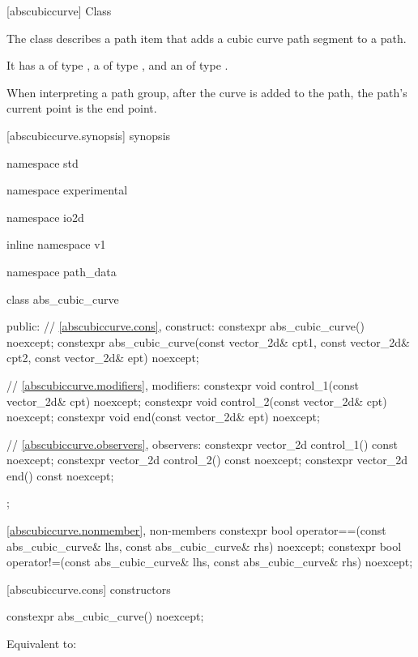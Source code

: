  [abscubiccurve] {Class }%

\pnum
{}%
The class  describes a path item that adds a cubic \bezierlocal curve path segment to a path.

\pnum
It has a  of type , a  of type , and an  of type .

\pnum
When interpreting a path group, after the curve is added to the path, the path's current point is the end point.

 [abscubiccurve.synopsis] { synopsis}%

\begin{codeblock}
namespace std { namespace experimental { namespace io2d { inline namespace v1 {
  namespace path_data {
    class abs_cubic_curve {
    public:
      // \ref{abscubiccurve.cons}, construct:
      constexpr abs_cubic_curve() noexcept;
      constexpr abs_cubic_curve(const vector_2d& cpt1, const vector_2d& cpt2,
        const vector_2d& ept) noexcept;

      // \ref{abscubiccurve.modifiers}, modifiers:
      constexpr void control_1(const vector_2d& cpt) noexcept;
      constexpr void control_2(const vector_2d& cpt) noexcept;
      constexpr void end(const vector_2d& ept) noexcept;


      // \ref{abscubiccurve.observers}, observers:
      constexpr vector_2d control_1() const noexcept;
      constexpr vector_2d control_2() const noexcept;
      constexpr vector_2d end() const noexcept;
    };
    
    \ref{abscubiccurve.nonmember}, non-members
    constexpr bool operator==(const abs_cubic_curve& lhs,
      const abs_cubic_curve& rhs) noexcept;
    constexpr bool operator!=(const abs_cubic_curve& lhs,
      const abs_cubic_curve& rhs) noexcept;
  }
} } } }
\end{codeblock}

 [abscubiccurve.cons] { constructors}

%
\begin{itemdecl}
constexpr abs_cubic_curve() noexcept;
\end{itemdecl}
\begin{itemdescr}
\pnum
\effects
Equivalent to: 
\end{itemdescr}

